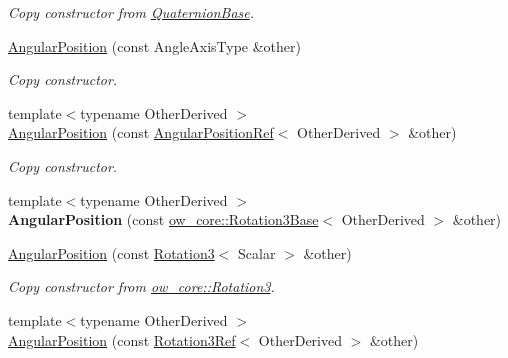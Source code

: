 \begin{DoxyCompactItemize}
\begin{DoxyCompactList}\small\item\em Copy constructor from \hyperlink{classow__core_1_1QuaternionBase}{Quaternion\+Base}. \end{DoxyCompactList}\item 
\hyperlink{classow__core_1_1AngularPosition_aa843bf36962c0b899943f76cc067b29a}{Angular\+Position} (const Angle\+Axis\+Type \&other)
\begin{DoxyCompactList}\small\item\em Copy constructor. \end{DoxyCompactList}\item 
{\footnotesize template$<$typename Other\+Derived $>$ }\\\hyperlink{classow__core_1_1AngularPosition_a48862e91c4e349c72d1118aceaf1c3f0}{Angular\+Position} (const \hyperlink{classow__core_1_1AngularPositionRef}{Angular\+Position\+Ref}$<$ Other\+Derived $>$ \&other)
\begin{DoxyCompactList}\small\item\em Copy constructor. \end{DoxyCompactList}\item 
{\footnotesize template$<$typename Other\+Derived $>$ }\\{\bfseries Angular\+Position} (const \hyperlink{classow__core_1_1Rotation3Base}{ow\+\_\+core\+::\+Rotation3\+Base}$<$ Other\+Derived $>$ \&other)\hypertarget{classow__core_1_1AngularPosition_a0d17dea922cbdd852b931c938866c4a6}{}\label{classow__core_1_1AngularPosition_a0d17dea922cbdd852b931c938866c4a6}

\item 
\hyperlink{classow__core_1_1AngularPosition_ad784e11ef9bc89c6b089852cbf051176}{Angular\+Position} (const \hyperlink{classow__core_1_1Rotation3}{Rotation3}$<$ Scalar $>$ \&other)\hypertarget{classow__core_1_1AngularPosition_ad784e11ef9bc89c6b089852cbf051176}{}\label{classow__core_1_1AngularPosition_ad784e11ef9bc89c6b089852cbf051176}

\begin{DoxyCompactList}\small\item\em Copy constructor from \hyperlink{classow__core_1_1Rotation3}{ow\+\_\+core\+::\+Rotation3}. \end{DoxyCompactList}\item 
{\footnotesize template$<$typename Other\+Derived $>$ }\\\hyperlink{classow__core_1_1AngularPosition_a876b1b8ba2c8b1c4b5535bc310f7bd96}{Angular\+Position} (const \hyperlink{classow__core_1_1Rotation3Ref}{Rotation3\+Ref}$<$ Other\+Derived $>$ \&other)\hypertarget{classow__core_1_1AngularPosition_a876b1b8ba2c8b1c4b5535bc310f7bd96}{}\label{classow__core_1_1AngularPosition_a876b1b8ba2c8b1c4b5535bc310f7bd96}


\end{DoxyCompactItemize}
